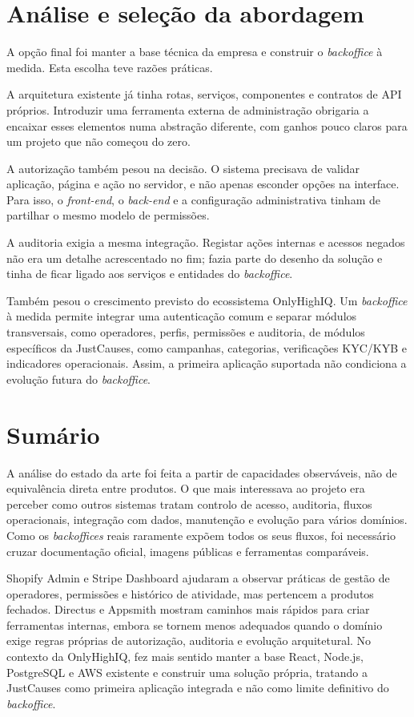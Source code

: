 \section{Análise e seleção da abordagem}
\label{sec:analise_selecao}

A opção final foi manter a base técnica da empresa e construir o \textit{backoffice} à medida. Esta escolha teve razões práticas.

A arquitetura existente já tinha rotas, serviços, componentes e contratos de \gls{API} próprios. Introduzir uma ferramenta externa de administração obrigaria a encaixar esses elementos numa abstração diferente, com ganhos pouco claros para um projeto que não começou do zero.

A autorização também pesou na decisão. O sistema precisava de validar aplicação, página e ação no servidor, e não apenas esconder opções na interface. Para isso, o \textit{front-end}, o \textit{back-end} e a configuração administrativa tinham de partilhar o mesmo modelo de permissões.

A auditoria exigia a mesma integração. Registar ações internas e acessos negados não era um detalhe acrescentado no fim; fazia parte do desenho da solução e tinha de ficar ligado aos serviços e entidades do \textit{backoffice}.

Também pesou o crescimento previsto do ecossistema OnlyHighIQ. Um \textit{backoffice} à medida permite integrar uma autenticação comum e separar módulos transversais, como operadores, perfis, permissões e auditoria, de módulos específicos da JustCauses, como campanhas, categorias, verificações KYC/KYB e indicadores operacionais. Assim, a primeira aplicação suportada não condiciona a evolução futura do \textit{backoffice}.


\section{Sumário}
\label{sec:sumario_cap2}

A análise do estado da arte foi feita a partir de capacidades observáveis, não de equivalência direta entre produtos. O que mais interessava ao projeto era perceber como outros sistemas tratam controlo de acesso, auditoria, fluxos operacionais, integração com dados, manutenção e evolução para vários domínios. Como os \textit{backoffices} reais raramente expõem todos os seus fluxos, foi necessário cruzar documentação oficial, imagens públicas e ferramentas comparáveis.

Shopify Admin e Stripe Dashboard ajudaram a observar práticas de gestão de operadores, permissões e histórico de atividade, mas pertencem a produtos fechados. Directus e Appsmith mostram caminhos mais rápidos para criar ferramentas internas, embora se tornem menos adequados quando o domínio exige regras próprias de autorização, auditoria e evolução arquitetural. No contexto da OnlyHighIQ, fez mais sentido manter a base React, Node.js, PostgreSQL e AWS existente e construir uma solução própria, tratando a JustCauses como primeira aplicação integrada e não como limite definitivo do \textit{backoffice}.
